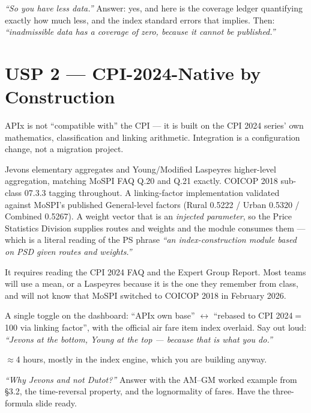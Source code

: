  \emph{``So you have less data.''} Answer: yes, and here is the
coverage ledger quantifying exactly how much less, and the index standard errors that
implies. Then: \emph{``inadmissible data has a coverage of zero, because it cannot be
published.''}

\section{USP 2 --- CPI-2024-Native by Construction}

\begin{uspbox}
 APIx is not ``compatible with'' the CPI --- it is built on the CPI 2024
series' own mathematics, classification and linking arithmetic. Integration is a
configuration change, not a migration project.
\end{uspbox}

 Jevons elementary aggregates and Young/Modified Laspeyres higher-level
aggregation, matching MoSPI FAQ Q.20 and Q.21 exactly. COICOP 2018 sub-class 07.3.3 tagging
throughout. A linking-factor implementation validated against MoSPI's published General-level
factors (Rural 0.5222 / Urban 0.5320 / Combined 0.5267). A weight vector that is an
\emph{injected parameter}, so the Price Statistics Division supplies routes and weights and
the module consumes them --- which is a literal reading of the PS phrase \emph{``an
index-construction module based on PSD given routes and weights.''}

 It requires reading the CPI 2024 FAQ and the Expert Group
Report. Most teams will use a mean, or a Laspeyres because it is the one they remember from
class, and will not know that MoSPI switched to COICOP 2018 in February 2026.

 A single toggle on the dashboard: ``APIx own base'' $\leftrightarrow$
``rebased to CPI 2024$=$100 via linking factor'', with the official air fare item index
overlaid. Say out loud: \emph{``Jevons at the bottom, Young at the top --- because that is
what you do.''}

 $\approx$4 hours, mostly in the index engine, which you are building
anyway.

 \emph{``Why Jevons and not Dutot?''} Answer with the AM--GM
worked example from \S3.2, the time-reversal property, and the lognormality of fares. Have
the three-formula slide ready.

